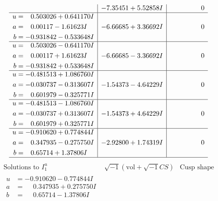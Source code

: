 \documentclass[1p]{elsarticle_modified}
\theoremstyle{definition}
\newcommand{\I}{\sqrt{-1}}
\begin{document}
$$\begin{array}{c|c|c}
 & -7.35451 + 5.52858 I & \phantom{-0.000000 } 0 \\ \hline\begin{aligned}
u &= \phantom{-}0.503026 + 0.641170 I \\
a &= \phantom{-}0.00117 - 1.61623 I \\
b &= -0.931842 - 0.533648 I\end{aligned}
 & -6.66685 + 3.36692 I & \phantom{-0.000000 } 0 \\ \hline\begin{aligned}
u &= \phantom{-}0.503026 - 0.641170 I \\
a &= \phantom{-}0.00117 + 1.61623 I \\
b &= -0.931842 + 0.533648 I\end{aligned}
 & -6.66685 - 3.36692 I & \phantom{-0.000000 } 0 \\ \hline\begin{aligned}
u &= -0.481513 + 1.086760 I \\
a &= -0.030737 - 0.313607 I \\
b &= \phantom{-}0.601979 - 0.325771 I\end{aligned}
 & -1.54373 - 4.64229 I & \phantom{-0.000000 } 0 \\ \hline\begin{aligned}
u &= -0.481513 - 1.086760 I \\
a &= -0.030737 + 0.313607 I \\
b &= \phantom{-}0.601979 + 0.325771 I\end{aligned}
 & -1.54373 + 4.64229 I & \phantom{-0.000000 } 0 \\ \hline\begin{aligned}
u &= -0.910620 + 0.774844 I \\
a &= \phantom{-}0.347935 - 0.275750 I \\
b &= \phantom{-}0.65714 + 1.37806 I\end{aligned}
 & -2.92800 + 1.74319 I & \phantom{-0.000000 } 0\\
 \hline 
 \end{array}$$\newpage$$\begin{array}{c|c|c}  
\text{Solutions to }I^u_{1}& \I (\text{vol} + \sqrt{-1}CS) & \text{Cusp shape}\\
 \hline 
\begin{aligned}
u &= -0.910620 - 0.774844 I \\
a &= \phantom{-}0.347935 + 0.275750 I \\
b &= \phantom{-}0.65714 - 1.37806 I\end{aligned}

\end{array}$$
\end{document}
